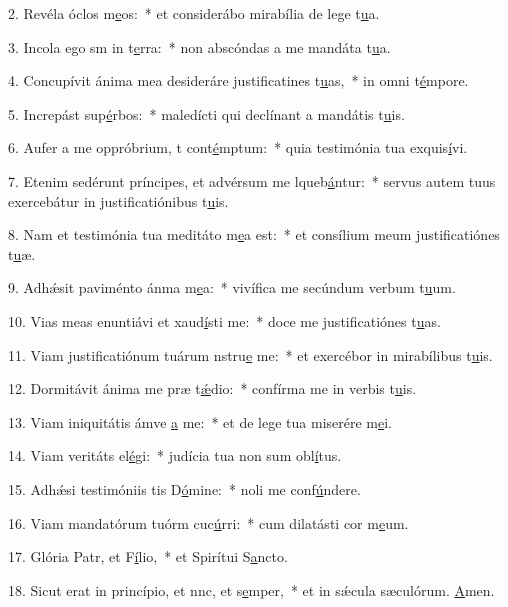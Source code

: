 2. Revéla óclos m\uline{e}os:~* et considerábo mirabília de lege t\uline{u}a.\par 
3. Incola ego sm in t\uline{e}rra:~* non abscóndas a me mandáta t\uline{u}a.\par 
4. Concupívit ánima mea desideráre justificatines t\uline{u}as,~* in omni t\uline{é}mpore.\par 
5. Increpást sup\uline{é}rbos:~* maledícti qui declínant a mandátis t\uline{u}is.\par 
6. Aufer a me oppróbrium, t cont\uline{é}mptum:~* quia testimónia tua exquis\uline{í}vi.\par 
7. Etenim sedérunt príncipes, et advérsum me lqueb\uline{á}ntur:~* servus autem tuus exercebátur in justificatiónibus t\uline{u}is.\par 
8. Nam et testimónia tua meditáto m\uline{e}a est:~* et consílium meum justificatiónes t\uline{u}æ.\par 
9. Adhǽsit paviménto ánma m\uline{e}a:~* vivífica me secúndum verbum t\uline{u}um.\par 
10. Vias meas enuntiávi et xaud\uline{í}sti me:~* doce me justificatiónes t\uline{u}as.\par 
11. Viam justificatiónum tuárum nstru\uline{e} me:~* et exercébor in mirabílibus t\uline{u}is.\par 
12. Dormitávit ánima me præ t\uline{ǽ}dio:~* confírma me in verbis t\uline{u}is.\par 
13. Viam iniquitátis ámve \uline{a} me:~* et de lege tua miserére m\uline{e}i.\par 
14. Viam veritáts el\uline{é}gi:~* judícia tua non sum obl\uline{í}tus.\par 
15. Adhǽsi testimóniis tis D\uline{ó}mine:~* noli me conf\uline{ú}ndere.\par 
16. Viam mandatórum tuórm cuc\uline{ú}rri:~* cum dilatásti cor m\uline{e}um.\par 
17. Glória Patr, et F\uline{í}lio,~* et Spirítui S\uline{a}ncto.\par 
18. Sicut erat in princípio, et nnc, et s\uline{e}mper,~* et in sǽcula sæculórum. \uline{A}men.\par 
